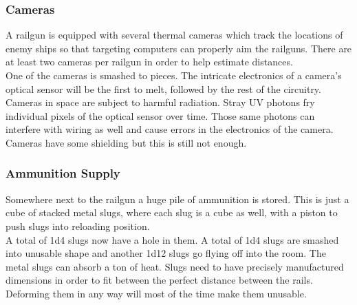 \documentclass[a4paper]{article}
\begin{document}
\vspace{-0.5cm} \hspace{-18pt} \subsubsection{Cameras} \label{railgun_cameras} \vspace{-0.2cm}
A railgun is equipped with several thermal cameras which track the locations of enemy ships so that targeting computers can properly aim the railguns. There are at least two cameras per railgun in order to help estimate distances.
\\ \pbhw
{}
{One of the cameras is smashed to pieces.}
{The intricate electronics of a camera's optical sensor will be the first to melt, followed by the rest of the circuitry.}
{Cameras in space are subject to harmful radiation. Stray UV photons fry individual pixels of the optical sensor over time. Those same photons can interfere with wiring as well and cause errors in the electronics of the camera. Cameras have some shielding but this is still not enough.}


\vspace{-0.5cm} \hspace{-18pt} \subsubsection{Ammunition Supply} \label{railgun_ammunition} \vspace{-0.2cm}
Somewhere next to the railgun a huge pile of ammunition is stored. This is just a cube of stacked metal slugs, where each slug is a cube as well, with a piston to push slugs into reloading position.
\\ \pbhw
{A total of 1d4 slugs now have a hole in them.}
{A total of 1d4 slugs are smashed into unusable shape and another 1d12 slugs go flying off into the room.}
{The metal slugs can absorb a ton of heat.}
{Slugs need to have precisely manufactured dimensions in order to fit between the perfect distance between the rails. Deforming them in any way will most of the time make them unusable.}
\end{document}
